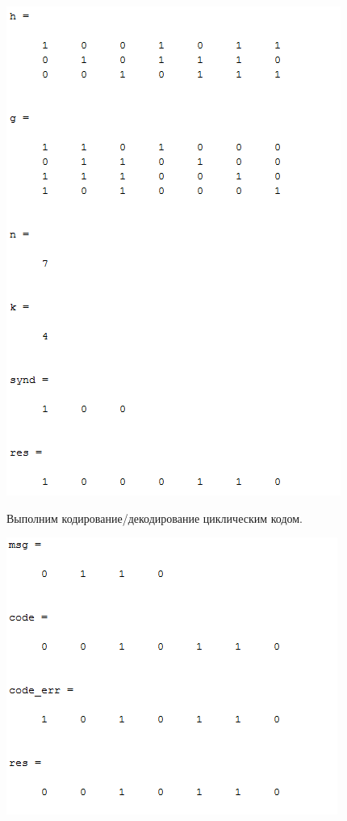 \documentclass[a4paper]{article}
\begin{document}
\includegraphics[scale = 0.7]{res2.png}

Выполним кодирование/декодирование циклическим кодом.


\includegraphics[scale = 0.7]{res3.png}
\end{document}
